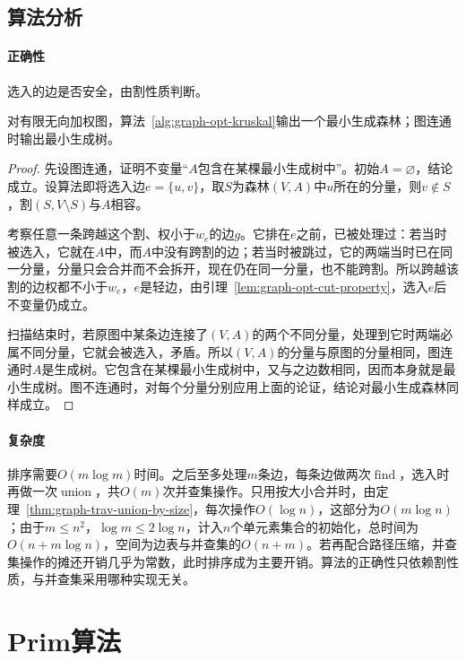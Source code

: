 \subsection{算法分析}

\paragraph{正确性}
选入的边是否安全，由割性质判断。

\begin{theorem}[Kruskal算法的正确性]
\label{thm:graph-opt-kruskal}
对有限无向加权图，算法~\ref{alg:graph-opt-kruskal}输出一个最小生成森林；图连通时输出最小生成树。
\end{theorem}

\begin{proof}
先设图连通，证明不变量“$A$包含在某棵最小生成树中”。初始$A=\varnothing$，结论成立。设算法即将选入边$e=\{u,v\}$，取$S$为森林$(V,A)$中$u$所在的分量，则$v\notin S$，割$(S,V\setminus S)$与$A$相容。

考察任意一条跨越这个割、权小于$w_e$的边$g$。它排在$e$之前，已被处理过：若当时被选入，它就在$A$中，而$A$中没有跨割的边；若当时被跳过，它的两端当时已在同一分量，分量只会合并而不会拆开，现在仍在同一分量，也不能跨割。所以跨越该割的边权都不小于$w_e$，$e$是轻边，由引理~\ref{lem:graph-opt-cut-property}，选入$e$后不变量仍成立。

扫描结束时，若原图中某条边连接了$(V,A)$的两个不同分量，处理到它时两端必属不同分量，它就会被选入，矛盾。所以$(V,A)$的分量与原图的分量相同，图连通时$A$是生成树。它包含在某棵最小生成树中，又与之边数相同，因而本身就是最小生成树。图不连通时，对每个分量分别应用上面的论证，结论对最小生成森林同样成立。
\end{proof}

\paragraph{复杂度}
排序需要$O(m\log m)$时间。之后至多处理$m$条边，每条边做两次$\operatorname{find}$，选入时再做一次$\operatorname{union}$，共$O(m)$次并查集操作。只用按大小合并时，由定理~\ref{thm:graph-trav-union-by-size}，每次操作$O(\log n)$，这部分为$O(m\log n)$；由于$m\leq n^2$，$\log m\leq2\log n$，计入$n$个单元素集合的初始化，总时间为$O(n+m\log n)$，空间为边表与并查集的$O(n+m)$。若再配合路径压缩，并查集操作的摊还开销几乎为常数，此时排序成为主要开销。算法的正确性只依赖割性质，与并查集采用哪种实现无关。

\section{Prim算法}
\label{sec:graph-opt-prim}

